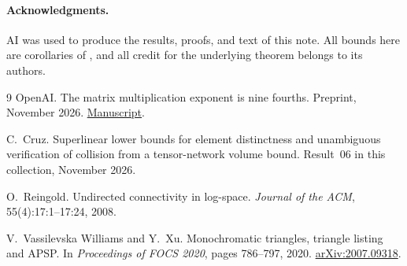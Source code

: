 \documentclass[11pt]{article}
\theoremstyle{definition}
\theoremstyle{remark}
\begin{document}
\paragraph{Acknowledgments.}
AI was used to produce the results, proofs, and text of this note.
All bounds here are corollaries of \cite[Theorem~2.2]{OAI}, and all
credit for the underlying theorem belongs to its authors.

\begin{thebibliography}{9}
OpenAI. The matrix multiplication exponent is nine fourths.
Preprint, November 2026.
\href{https://github.com/openai/math/blob/3344da59991ed94f9ba711217b29c1d760badfa6/preprints/The-matrix-multiplication-exponent-is-nine-fourths-November-24-2026/paper.pdf}{Manuscript}.

C.~Cruz. Superlinear lower bounds for element distinctness and unambiguous
verification of collision from a tensor-network volume bound. Result~06 in
this collection, November 2026.

O.~Reingold. Undirected connectivity in log-space. \emph{Journal of the
ACM}, 55(4):17:1--17:24, 2008.

V.~Vassilevska Williams and Y.~Xu. Monochromatic triangles, triangle
listing and APSP. In \emph{Proceedings of FOCS 2020}, pages 786--797, 2020.
\href{https://arxiv.org/abs/2007.09318}{arXiv:2007.09318}.
\end{thebibliography}
\end{document}
